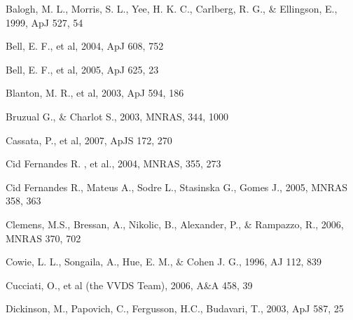 \documentclass[referee]{aa}
\begin{document}
\begin{thebibliography}{}



 Balogh, M. L., Morris, S. L., Yee, H. K. C., Carlberg, R. G., \& Ellingson, E., 1999, ApJ 527, 54   




 Bell, E. F., et al, 2004, ApJ 608, 752

 Bell, E. F., et al, 2005, ApJ 625, 23




 Blanton, M. R., et al, 2003, ApJ 594, 186





  Bruzual G., \&  Charlot S., 2003, MNRAS, 344, 1000

 Cassata, P., et al, 2007, ApJS 172, 270

 Cid Fernandes R. , et al., 2004, MNRAS, 355, 273

 Cid Fernandes R., Mateus A., Sodre L., Stasinska G.,
Gomes J., 2005, MNRAS 358, 363
 
 Clemens, M.S., Bressan, A., Nikolic, B., Alexander, P., \& Rampazzo, R., 2006, MNRAS 370, 702




 Cowie, L. L., Songaila, A., Hue, E. M., \& Cohen J. G., 1996,  AJ 112, 839

 Cucciati, O., et al (the VVDS Team), 2006, A\&A 458, 39

 Dickinson, M., Papovich, C., Fergusson, H.C., Budavari, T., 2003, ApJ 587, 25


\end{thebibliography}
\end{document}
